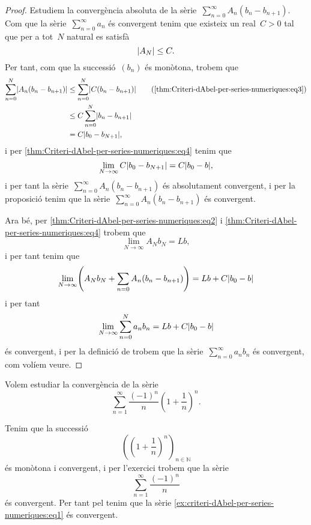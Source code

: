 \documentclass[../analisi-matematica.tex]{subfiles}
\begin{document}
\begin{proof}
        Estudiem la convergència absoluta de la sèrie~\(\sum_{n=0}^{\infty}A_{n}(b_{n}-b_{n+1})\).
        Com que la sèrie~\(\sum_{n=0}^{\infty}a_{n}\) és convergent tenim que existeix un real~\(C>0\) tal que per a tot~\(N\) natural es satisfà
        \begin{equation}
            \label{thm:Criteri-dAbel-per-series-numeriques:eq3}
            \abs{A_{N}}\leq C.
        \end{equation}
        Per tant, com que la successió~\((b_{n})\) és monòtona, trobem que
        \begin{align*}
            \sum_{n=0}^{N}\abs{A_{n}(b_{n}-b_{n+1})}&\leq\sum_{n=0}^{N}\abs{C(b_{n}-b_{n+1})} \tag{\ref{thm:Criteri-dAbel-per-series-numeriques:eq3}}\\
            &\leq C\sum_{n=0}^{N}\abs{b_{n}-b_{n+1}} \\
            &=C\abs{b_{0}-b_{N+1}},
        \end{align*}
        i per \eqref{thm:Criteri-dAbel-per-series-numeriques:eq4} tenim que
        \[
            \lim_{N\to\infty}C\abs{b_{0}-b_{N+1}}=C\abs{b_{0}-b},
        \]
        i per tant la sèrie~\(\sum_{n=0}^{\infty}A_{n}(b_{n}-b_{n+1})\) és absolutament convergent, %
        i per la proposició  tenim que la sèrie~\(\sum_{n=0}^{\infty}A_{n}(b_{n}-b_{n+1})\) és convergent.

        Ara bé, per \eqref{thm:Criteri-dAbel-per-series-numeriques:eq2} i \eqref{thm:Criteri-dAbel-per-series-numeriques:eq4} trobem que
        \[
            \lim_{N\to\infty}A_{N}b_{N}=Lb,
        \]
        i per tant tenim que
        \[
            \lim_{N\to\infty}\left(A_{N}b_{N}+\sum_{n=0}A_{n}(b_{n}-b_{n+1})\right)=Lb+C\abs{b_{0}-b}
        \]
        i per tant
        \[
            \lim_{N\to\infty}\sum_{n=0}^{N}a_{n}b_{n}=Lb+C\abs{b_{0}-b}
        \]
        és convergent, i per la definició de  trobem que la sèrie~\(\sum_{n=0}^{\infty}a_{n}b_{n}\) és convergent, com volíem veure.
    \end{proof}
    \begin{example}
        \label{ex:criteri-dAbel-per-series-numeriques}
        Volem estudiar la convergència de la sèrie
        \begin{equation}
            \label{ex:criteri-dAbel-per-series-numeriques:eq1}
            \sum_{n=1}^{\infty}\frac{(-1)^{n}}{n}\left(1+\frac{1}{n}\right)^{n}.
        \end{equation}
    \end{example}
    \begin{solution}
        Tenim que la successió %
        \[
            \left(\left(1+\frac{1}{n}\right)^{n}\right)_{n\in\mathbb{N}}
        \]
        és monòtona i convergent, i per l'exercici  trobem que la sèrie
        \[
            \sum_{n=1}^{\infty}\frac{(-1)^{n}}{n}
        \]
        és convergent.
        Per tant pel  tenim que la sèrie \eqref{ex:criteri-dAbel-per-series-numeriques:eq1} és convergent.
    \end{solution}
\end{document}
